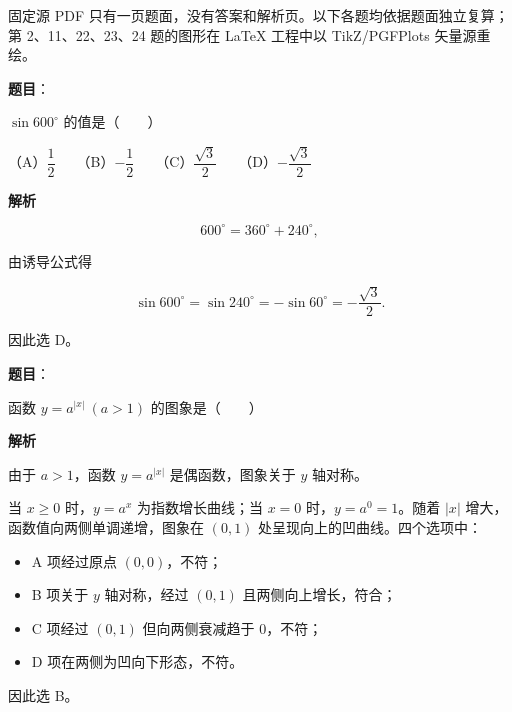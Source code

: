 

\begin{gktip}
固定源 PDF 只有一页题面，没有答案和解析页。以下各题均依据题面独立复算；第 2、11、22、23、24 题的图形在 LaTeX 工程中以 TikZ/PGFPlots 矢量源重绘。
\end{gktip}

\begin{answer}

\textbf{题目}：

$\sin600^\circ$ 的值是\mbox{（　　）}

（A）$\dfrac12$　　（B）$-\dfrac12$　　（C）$\dfrac{\sqrt3}2$　　（D）$-\dfrac{\sqrt3}2$

\textbf{解析}

\nopagebreak[4]
\[
600^\circ = 360^\circ + 240^\circ,
\]

由诱导公式得

\nopagebreak[4]
\[
\sin600^\circ = \sin240^\circ = -\sin60^\circ = -\frac{\sqrt3}{2}.
\]

因此选 D。


\end{answer}
\begin{answer}

\textbf{题目}：

函数 $y=a^{|x|}\ (a>1)$ 的图象是\mbox{（　　）}
\nopagebreak[4]
\begin{center}\end{center}
\nopagebreak[4]
\textbf{解析}

由于 $a>1$，函数 $y=a^{|x|}$ 是偶函数，图象关于 $y$ 轴对称。

当 $x\ge0$ 时，$y=a^x$ 为指数增长曲线；当 $x=0$ 时，$y=a^0=1$。随着 $|x|$ 增大，函数值向两侧单调递增，图象在 $(0,1)$ 处呈现向上的凹曲线。四个选项中：

\begin{itemize}
\item A 项经过原点 $(0,0)$，不符；
\item B 项关于 $y$ 轴对称，经过 $(0,1)$ 且两侧向上增长，符合；
\item C 项经过 $(0,1)$ 但向两侧衰减趋于 0，不符；
\item D 项在两侧为凹向下形态，不符。
\end{itemize}

因此选 B。


\end{answer}
